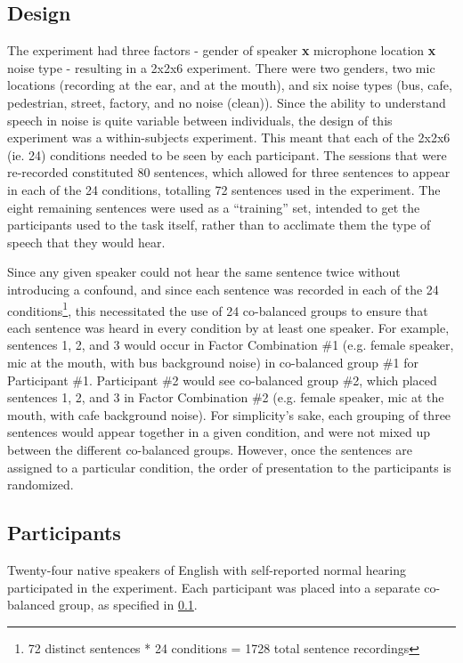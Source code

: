 \documentclass[dissertation,copyright]{uathesis}
\begin{document}
\subsection{Design}
\label{chap4:methods:design}

The experiment had three factors - gender of speaker \textbf{x} microphone location \textbf{x} noise type - resulting in a 2x2x6 experiment.  There were two genders, two mic locations (recording at the ear, and at the mouth), and six noise types (bus, cafe, pedestrian, street, factory, and no noise (clean)).  Since the ability to understand speech in noise is quite variable between individuals, the design of this experiment was a within-subjects experiment.  This meant that each of the 2x2x6 (ie. 24) conditions needed to be seen by each participant.  The sessions that were re-recorded constituted 80 sentences, which allowed for three sentences to appear in each of the 24 conditions, totalling 72 sentences used in the experiment.  The eight remaining sentences were used as a ``training'' set, intended to get the participants used to the task itself, rather than to acclimate them the type of speech that they would hear.

Since any given speaker could not hear the same sentence twice without introducing a confound, and since each sentence was recorded in each of the 24 conditions\footnote{72 distinct sentences * 24 conditions = 1728 total sentence recordings}, this necessitated the use of 24 co-balanced groups to ensure that each sentence was heard in every condition by at least one speaker.  For example, sentences 1, 2, and 3 would occur in Factor Combination \#1 (e.g. female speaker, mic at the mouth, with bus background noise) in co-balanced group \#1 for Participant \#1. Participant \#2 would see co-balanced group \#2, which placed sentences 1, 2, and 3 in Factor Combination \#2 (e.g. female speaker, mic at the mouth, with cafe background noise).  For simplicity's sake, each grouping of three sentences would appear together in a given condition, and were not mixed up between the different co-balanced groups.  However, once the sentences are assigned to a particular condition, the order of presentation to the participants is randomized.

\subsection{Participants}

Twenty-four native speakers of English with self-reported normal hearing participated in the experiment. Each participant was placed into a separate co-balanced group, as specified in \ref{chap4:methods:design}.
\end{document}
